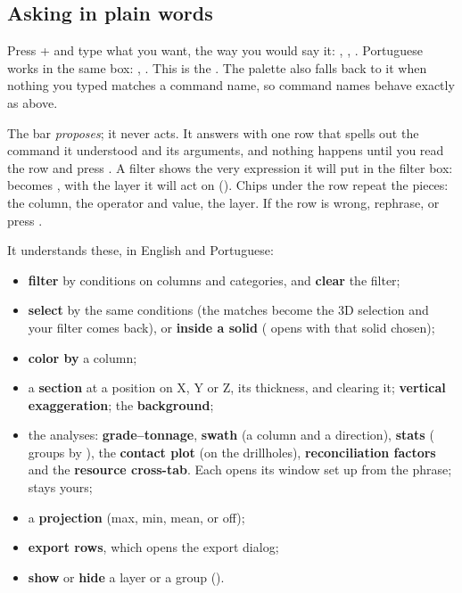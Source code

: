 \subsection{Asking in plain words}\label{sec:start-plain}
Press + and type what you want, the way you would say it: , , . Portuguese works in the same box: , . This is the . The  palette also falls back to it when nothing you typed matches a command name, so command names behave exactly as above.

The bar \emph{proposes}; it never acts. It answers with one row that spells out the command it understood and its arguments, and nothing happens until you read the row and press . A filter shows the very expression it will put in the filter box:  becomes , with the layer it will act on (). Chips under the row repeat the pieces: the column, the operator and value, the layer. If the row is wrong, rephrase, or press .

It understands these, in English and Portuguese:
\begin{itemize}
\item \textbf{filter} by conditions on columns and categories, and \textbf{clear} the filter;
\item \textbf{select} by the same conditions (the matches become the 3D selection and your filter comes back), or \textbf{inside a solid} ( opens  with that solid chosen);
\item \textbf{color by} a column;
\item a \textbf{section} at a position on X, Y or Z, its thickness, and clearing it; \textbf{vertical exaggeration}; the \textbf{background};
\item the analyses: \textbf{grade–tonnage}, \textbf{swath} (a column and a direction), \textbf{stats} ( groups by ), the \textbf{contact plot} (on the drillholes), \textbf{reconciliation factors} and the \textbf{resource cross-tab}. Each opens its window set up from the phrase;  stays yours;
\item a \textbf{projection} (max, min, mean, or off);
\item \textbf{export rows}, which opens the export dialog;
\item \textbf{show} or \textbf{hide} a layer or a group ().
\end{itemize}

